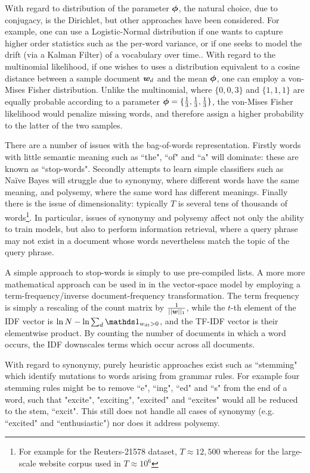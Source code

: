 With regard to distribution of the parameter $\bm \phi$, the natural choice, due to conjugacy, is the Dirichlet, but other approaches have been considered. For example, one can use a Logistic-Normal distribution if one wants to capture higher order statistics such as the per-word variance, or if one seeks to model the drift (via a Kalman Filter) of a vocabulary over time.\cite{Blei2006a}. With regard to the multinomial likelihood, if one wishes to uses a distribution equivalent to a cosine distance between a sample document ${ \bm w_d }$ and the mean $\bm \phi$, one can employ a von-Mises Fisher distribution\cite{Reisinger2010}. Unlike the multinomial, where $\{0, 0, 3\}$ and $\{1, 1, 1\}$ are equally probable according to a parameter $\bm \phi = \{\frac{1}{ {3} }, \frac{1}{ {3} }, \frac{1}{ {3} }\}$, the von-Mises Fisher likelihood would penalize missing words, and therefore assign a higher probability to the latter of the two samples.

There are a number of issues with the bag-of-words representation. Firstly words with little semantic meaning such as ``the", ``of" and ``a" will dominate: these are known as ``stop-words". Secondly attempts to learn simple classifiers such as Na\"ive Bayes\cite{Nigam2000} will struggle due to synonymy, where different words have the same meaning, and polysemy, where the same word has different meanings. Finally there is the issue of dimensionality: typically $T$ is several tens of thousands of words\footnote{For example for the Reuters-21578 dataset, $T\approx 12,500$ whereas for the large-scale website corpus used in\cite{Smola2010} $T \approx 10^6$}. In particular, issues of synonymy and polysemy affect not only the ability to train models, but also to perform information retrieval, where a query phrase may not exist in a document whose words nevertheless match the topic of the query phrase.

A simple approach to stop-words is simply to use pre-compiled lists. A more more mathematical approach can be used in in the vector-space model by employing a term-frequency/inverse document-frequency transformation. The term frequency is simply a rescaling of the count matrix by $\frac{1}{||\bm w||_1}$, while the $t$-th element of the IDF vector is $\ln N - \ln \sum_d \one_{w_{dt} > 0}$, and the TF-IDF vector is their elementwise product. By counting the number of documents in which a word occurs, the IDF downscales terms which occur across all documents. 

With regard to synonymy, purely heuristic approaches exist such as ``stemming" which identify mutations to words arising from grammar rules. For example four stemming rules might be to remove ``e", ``ing", ``ed" and ``s" from the end of a word, such that "excite", "exciting", "excited" and ``excites" would all be reduced to the stem, ``excit". This still does not handle all cases of synonymy (e.g. ``excited" and ``enthusiastic") nor does it address polysemy.

